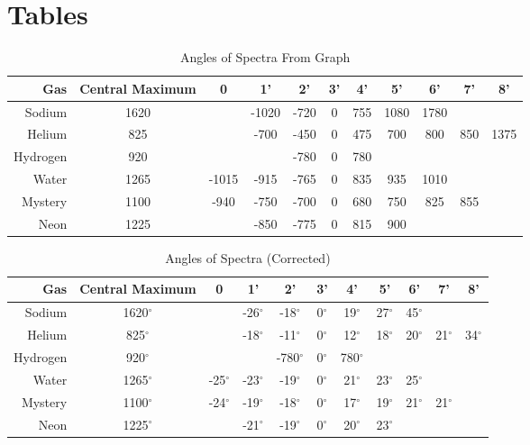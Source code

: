 \documentclass[11.8pt]{amsart}
\begin{document}
\vfill
\restoregeometry
\newpage

\section{Tables}
\begin{table}[H]
\centering
{}
\caption{Angles of Spectra From Graph}
\label{my-label}
\begin{tabular}{r|c|c|c|c|c|c|c|c|c|c}
Gas      & Central Maximum & 0     & 1'    & 2'   & 3' & 4'  & 5'   & 6'   & 7'  & 8'   \\\hline
Sodium   & 1620            &       & -1020 & -720 & 0  & 755 & 1080 & 1780 &     &      \\
Helium   & 825             &       & -700  & -450 & 0  & 475 & 700  & 800  & 850 & 1375 \\
Hydrogen & 920             &       &       & -780 & 0  & 780 &      &      &     &      \\
Water    & 1265            & -1015 & -915  & -765 & 0  & 835 & 935  & 1010 &     &      \\
Mystery  & 1100            & -940  & -750  & -700 & 0  & 680 & 750  & 825  & 855 &      \\
Neon     & 1225            &       & -850  & -775 & 0  & 815 & 900  &      &     &
\end{tabular}
\end{table}

\begin{table}[H]
\centering
{}
\caption{Angles of Spectra (Corrected)}
\label{my-label}
\begin{tabular}{r|c|c|c|c|c|c|c|c|c|c}
Gas      & Central Maximum & 0   & 1'  & 2'   & 3' & 4'  & 5' & 6' & 7' & 8' \\\hline
Sodium   & 1620$^{\circ}$            &     & -26$^{\circ}$ & -18$^{\circ}$  & 0$^{\circ}$  & 19$^{\circ}$  & 27$^{\circ}$ & 45$^{\circ}$ &    &    \\
Helium   & 825$^{\circ}$            &     & -18$^{\circ}$ & -11$^{\circ}$  & 0$^{\circ}$  & 12$^{\circ}$  & 18$^{\circ}$ & 20$^{\circ}$ & 21$^{\circ}$ & 34$^{\circ}$ \\
Hydrogen & 920$^{\circ}$            &     &     & -780$^{\circ}$ & 0$^{\circ}$  & 780$^{\circ}$ &    &    &    &    \\
Water    & 1265$^{\circ}$            & -25$^{\circ}$ & -23$^{\circ}$ & -19$^{\circ}$  & 0$^{\circ}$  & 21$^{\circ}$  & 23$^{\circ}$ & 25$^{\circ}$ &    &    \\
Mystery  & 1100$^{\circ}$            & -24$^{\circ}$ & -19$^{\circ}$ & -18$^{\circ}$  & 0$^{\circ}$  & 17$^{\circ}$  & 19$^{\circ}$ & 21$^{\circ}$ & 21$^{\circ}$ &    \\
Neon     & 1225$^{\circ}$            &     & -21$^{\circ}$ & -19$^{\circ}$  & 0$^{\circ}$  & 20$^{\circ}$  & 23$^{\circ}$ &   &    &
\end{tabular}
\end{table}
\end{document}
